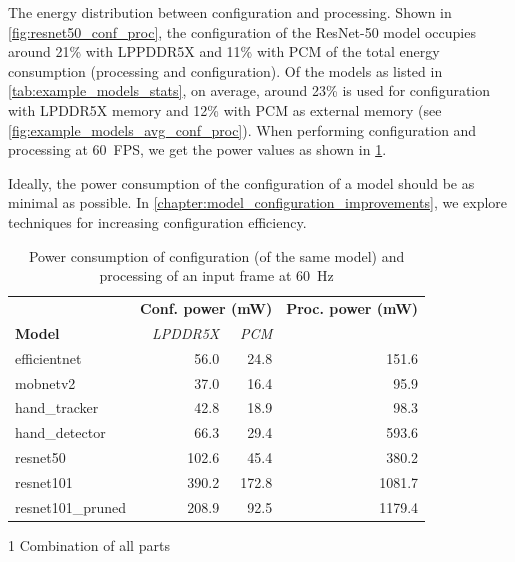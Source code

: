 The energy distribution between configuration and processing.
Shown in \cref{fig:resnet50_conf_proc}, the configuration of the ResNet-50 model occupies around 21\% with LPPDDR5X and 11\% with PCM of the total energy consumption (processing and configuration).
Of the models as listed in \cref{tab:example_models_stats}, on average, around 23\% is used for configuration with LPDDR5X memory and 12\% with PCM as external memory (see \cref{fig:example_models_avg_conf_proc}).
When performing configuration and processing at \SI{60}{FPS}, we get the power values as shown in \cref{tab:example_models_power_consumption}.

Ideally, the power consumption of the configuration of a model should be as minimal as possible.
In \cref{chapter:model_configuration_improvements}, we explore techniques for increasing configuration efficiency.

\begin{table}[]
    \centering
    \begin{threeparttable}
        \begin{tabular}{@{}lrrr@{}}
            \toprule
                                       & \multicolumn{2}{l}{\textbf{Conf. power (mW)}} & \textbf{Proc. power (mW)} \\ \cmidrule(l){2-3} 
            \textbf{Model}             & \textit{LPDDR5X}  & \textit{PCM}    & \\ \midrule
            efficientnet               & 56.0              & 24.8            & 151.6 \\
            mobnetv2                   & 37.0              & 16.4            & 95.9 \\
            hand\_tracker              & 42.8              & 18.9            & 98.3 \\
            hand\_detector             & 66.3              & 29.4            & 593.6 \\
            resnet50                   & 102.6             & 45.4            & 380.2 \\
            resnet101\tnote{1}         & 390.2             & 172.8           & 1081.7 \\
            resnet101\_pruned\tnote{1} & 208.9             & 92.5            & 1179.4 \\ \bottomrule
        \end{tabular}
        \begin{tablenotes}
            \item[1] Combination of all parts
        \end{tablenotes}
    \end{threeparttable}
    \caption{Power consumption of configuration (of the same model) and processing of an input frame at \SI{60}{Hz}}
    \label{tab:example_models_power_consumption}
\end{table}


